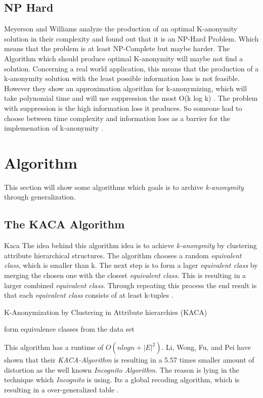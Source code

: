 \documentclass{llncs}
\begin{document}
\subsection{NP Hard}
Meyerson and Williams analyze the production of an optimal K-anonymity solution in their complexity and found out that it is an NP-Hard Problem. Which means that the problem is at least NP-Complete but maybe harder. The Algorithm which should produce optimal K-anonymity will maybe not find a solution. Concerning a real world application, this means that the production of a k-anonymity solution with the least possible information loss is not feasible. However they show an approximation algorithm for k-anonymizing, which will take polynomial time and will use suppression the most O(k log k)  \cite{sweeney2002k}. The problem with suppression is the high information loss it produces. So someone had to choose between time complexity and information loss as a barrier for the implemenation of k-anonymity \cite{el2009globally}. 



\section{Algorithm}
This section will show some algorithms which goals is to archive \textit{k-anonymity} through generalization. 

\subsection{The KACA Algorithm}{Kaca}
The idea behind this algorithm idea is to achieve \textit{k-anonymity} by clustering attribute hierarchical structures. The algorithm chooses a random \textit{equivalent class}, which is smaller than k. The next step is to form a lager \textit{equivalent class} by merging the chosen one with the closest \textit{equivalent class}. This is resulting in a larger combined \textit{equivalent class}. Through repeating this process the end result is that each \textit{equivalent class} consists of at least k-tuples \cite{li2006achieving}.\\
\begin{algorithm}[H]
	\caption{K-Anonymization by Clustering in Attribute hierarchies (KACA) \cite{li2006achieving}}
	form equivalence classes from the data set\\
\end{algorithm}
This algorithm has a runtime of $O(nlogn + |E|^{2})$. Li, Wong, Fu, and Pei have shown that their \textit{KACA-Algorithm} is resulting in a 5.57 times smaller amount of distortion as the well known \textit{Incognito Algorithm}. The reason is lying in the technique which \textit{Incognito} is using. Its a global recoding algorithm, which is resulting in a over-generalized table \cite{li2006achieving}.
\end{document}
